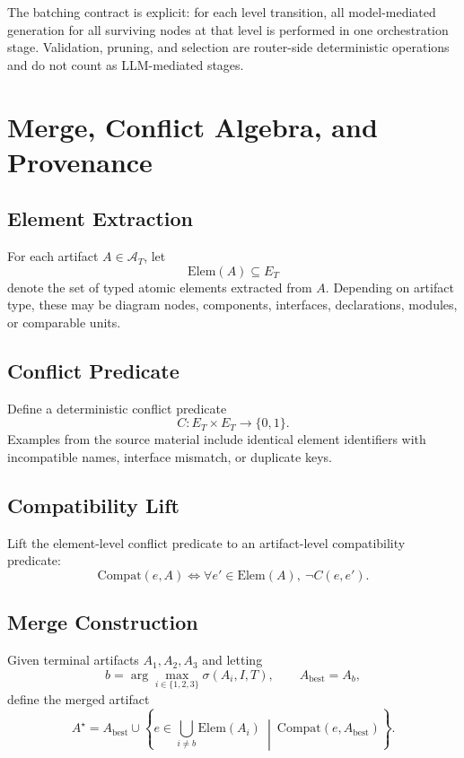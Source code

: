 \documentclass[11pt,a4paper]{article}
\numberwithin{equation}{section}
\theoremstyle{definition}
\newcommand{\Elems}{\mathrm{Elem}}
\newcommand{\Compat}{\mathrm{Compat}}
\newcommand{\Artifacts}{\mathcal{A}}
\begin{document}
The batching contract is explicit: for each level transition, all model-mediated generation for all surviving nodes at that level is performed in one orchestration stage. Validation, pruning, and selection are router-side deterministic operations and do not count as LLM-mediated stages.

\section{Merge, Conflict Algebra, and Provenance}
\label{sec:merge}

\subsection{Element Extraction}

For each artifact \(A\in \Artifacts_T\), let
\[
\Elems(A)\subseteq E_T
\]
denote the set of typed atomic elements extracted from \(A\). Depending on artifact type, these may be diagram nodes, components, interfaces, declarations, modules, or comparable units.

\subsection{Conflict Predicate}

Define a deterministic conflict predicate
\[
C:E_T\times E_T\to \{0,1\}.
\]
Examples from the source material include identical element identifiers with incompatible names, interface mismatch, or duplicate keys.

\subsection{Compatibility Lift}

Lift the element-level conflict predicate to an artifact-level compatibility predicate:
\[
\Compat(e,A)\iff \forall e'\in \Elems(A),\ \neg C(e,e').
\]

\subsection{Merge Construction}

Given terminal artifacts \(A_1,A_2,A_3\) and letting
\[
b=\arg\max_{i\in\{1,2,3\}} \sigma(A_i,I,T),
\qquad A_{\mathrm{best}}=A_b,
\]
define the merged artifact
\begin{equation}
\label{eq:merge}
A^\star
=
A_{\mathrm{best}}
\cup
\left\{
e\in \bigcup_{i\neq b}\Elems(A_i)\ \middle|\ \Compat(e,A_{\mathrm{best}})
\right\}.
\end{equation}
\end{document}
